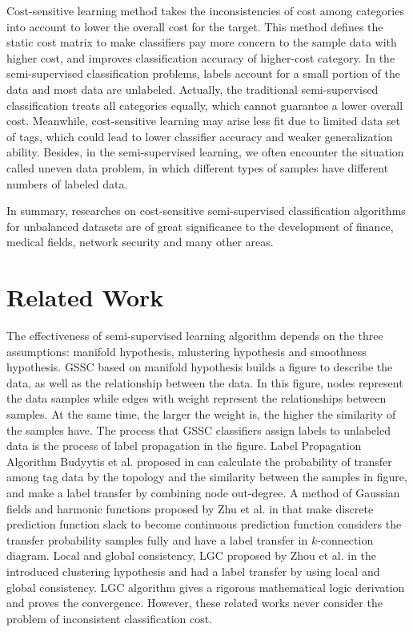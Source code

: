 \documentclass{svjour3}                     %
\begin{document}
Cost-sensitive learning method \cite{gao2011active,elkan2001foundations,zhou2010multi,domingos1999metacost,fan1999adacost} takes the inconsistencies of cost among categories into account to lower the overall cost for the target. This method defines the static cost matrix to make classifiers pay more concern to the sample data with higher cost, and improves classification accuracy of higher-cost category. In the semi-supervised classification problems, labels account for a small portion of the data and most data are unlabeled. Actually, the traditional semi-supervised classification treats all categories equally, which cannot guarantee a lower overall cost. Meanwhile, cost-sensitive learning may arise less fit due to limited data set of tags, which could lead to lower classifier accuracy and weaker generalization ability. Besides, in the semi-supervised learning, we often encounter the situation called uneven data problem, in which different types of samples have different numbers of labeled data.

In summary, researches on cost-sensitive semi-supervised classification algorithms for unbalanced datasets are of great significance to the development of finance, medical fields, network security and many other areas.

\section{Related Work}
The effectiveness of semi-supervised learning algorithm depends on the three assumptions: manifold hypothesis\cite{urner2011access,zhou2010semi}, mlustering hypothesis and smoothness hypothesis. GSSC based on manifold hypothesis builds a figure to describe the data, as well as the relationship between the data. In this figure, nodes represent the data samples while edges with weight represent the relationships between samples. At the same time, the larger the weight is, the higher the similarity of the samples have. The process that GSSC classifiers assign labels to unlabeled data is the process of label propagation in the figure. Label Propagation Algorithm Budyytis et al. proposed in \cite{budvytis2010label}  can calculate the probability of transfer among tag data by the topology and the similarity between the samples in figure, and make a label transfer by combining node out-degree. A method of Gaussian fields and harmonic functions proposed by Zhu et al. in \cite{zhu2003semi} that make discrete prediction function slack to become continuous prediction function considers the transfer probability samples fully and have a label transfer in $k$-connection diagram. Local and global consistency, LGC proposed by Zhou et al. in the \cite{zhou2004learning} introduced clustering hypothesis and had a label transfer by using local and global consistency. LGC algorithm gives a rigorous mathematical logic derivation and proves the convergence. However, these related works never consider the problem of inconsistent classification cost.
\end{document}
